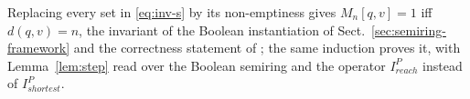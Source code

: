 \balance %
\begin{remark}
	Replacing every set in \eqref{eq:inv-s} by its non-emptiness gives $M_n[q, v] = 1$ iff $d(q, v) = n$, the invariant of the Boolean instantiation of Sect.~\ref{sec:semiring-framework} and the correctness statement of \cite{belyanin2150single}; the same induction proves it, with Lemma~\ref{lem:step} read over the Boolean semiring and the operator $I^P_{reach}$ instead of $I^P_{shortest}$.
\end{remark}
